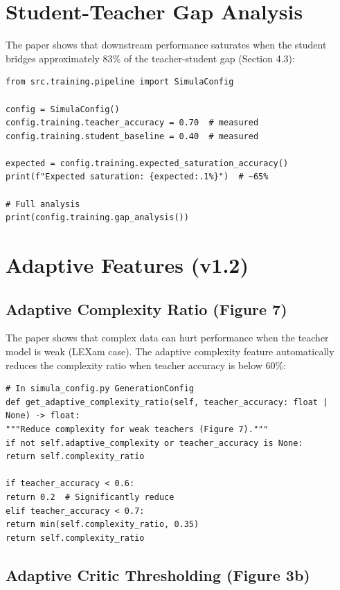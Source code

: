 \documentclass[12pt,a4paper,twoside]{report}
\begin{document}
\section{Student-Teacher Gap Analysis}

The paper shows that downstream performance saturates when the student bridges
approximately 83\% of the teacher-student gap (Section 4.3):

\begin{lstlisting}[language=jsonx,caption={Gap analysis}]
from src.training.pipeline import SimulaConfig

config = SimulaConfig()
config.training.teacher_accuracy = 0.70  # measured
config.training.student_baseline = 0.40  # measured

expected = config.training.expected_saturation_accuracy()
print(f"Expected saturation: {expected:.1%}")  # ~65%

# Full analysis
print(config.training.gap_analysis())
\end{lstlisting}

\section{Adaptive Features (v1.2)}

\subsection{Adaptive Complexity Ratio (Figure 7)}

The paper shows that complex data can hurt performance when the teacher model is weak
(LEXam case). The adaptive complexity feature automatically reduces the complexity
ratio when teacher accuracy is below 60\%:

\begin{lstlisting}[language=jsonx,caption={Adaptive complexity ratio}]
# In simula_config.py GenerationConfig
def get_adaptive_complexity_ratio(self, teacher_accuracy: float | None) -> float:
"""Reduce complexity for weak teachers (Figure 7)."""
if not self.adaptive_complexity or teacher_accuracy is None:
return self.complexity_ratio

if teacher_accuracy < 0.6:
return 0.2  # Significantly reduce
elif teacher_accuracy < 0.7:
return min(self.complexity_ratio, 0.35)
return self.complexity_ratio
\end{lstlisting}

\subsection{Adaptive Critic Thresholding (Figure 3b)}
\end{document}
